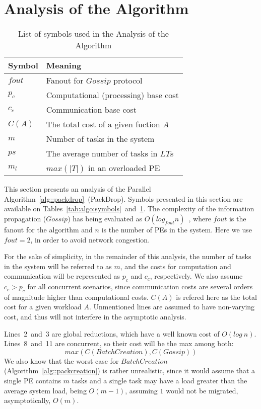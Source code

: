 \section{Analysis of the Algorithm} \label{sec:analysis}

\begin{table}[!t]
	\caption{List of symbols used in the Analysis of the Algorithm}
	\centering	
	\begin{tabular}{l |l}
		Symbol			& Meaning\\		\hline
		$fout$			& Fanout for $Gossip$ protocol						 \\ 
		$p_c$			& Computational (processing) base cost				 \\
		$c_c$			& Communication base cost							 \\
		$C(A)$			& The total cost of a given fuction $A$				 \\
		$m$				& Number of tasks in the system						 \\
		$ps$				& The average number of tasks in $LT$s				 \\
		$m_l$			& $max(|T|)$ in an overloaded PE						 \\
	\end{tabular}
	\label{tab:analysis:symbols}
\end{table}

This section presents an analysis of the Parallel Algorithm~\ref{alg::packdrop}~(PackDrop). 
Symbols presented in this section are available on Tables~\ref{tab:algo:symbols}~and~\ref{tab:analysis:symbols}.
The complexity of the information propagation ($Gossip$) has being evaluated as $O(log_{fout}n)$~\cite{grapevine},
where $fout$ is the fanout for the algorithm and $n$ is the number of PEs in the system.
Here we use $fout=2$, in order to avoid network congestion. 

For the sake of simplicity, in the remainder of this analysis, the number of tasks in the system
will be referred to as $m$, and the costs for computation and communication will be represented as $p_c$ and $c_c$, respectively.
We also assume $c_c > p_c$ for all concurrent scenarios, since communication costs are several orders of magnitude higher than computational costs.
$C(A)$ is refered here as the total cost for a given workload $A$.
Unmentioned lines are assumed to have non-varying cost, and thus will not interfere in the asymptotic analysis.

Lines~2~and~3 are global reductions, which have a well known cost of $O(log\ n)$.
Lines~8~and~11 are concurrent, so their cost will be the max among both:
\begin{equation}
  max(C(BatchCreation),C(Gossip))
\end{equation}
We also know that the worst case for $BatchCreation$ (Algorithm~\ref{alg::packcreation}) is rather unrealistic, 
since it would assume that a single PE contains $m$ tasks and a single task may have a load greater than the average system load, being $O(m-1)$, assuming $1$ would not be migrated, asymptotically, $O(m)$.

